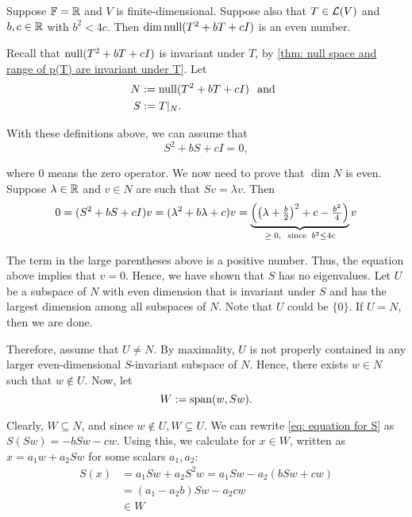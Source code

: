 \begin{thm}
  \label{thm: even-dimensional null space}
  Suppose $\mathbb{F} = \mathbb{R}$ and $V$ is finite-dimensional. Suppose also that $T \in \mathcal{L} (V)$ and $b,c \in \mathbb{R}$ with $b^2 < 4c$. Then $\dim \operatorname{null} (T^2 +bT +cI)$ is an even number.
\end{thm}
\begin{prf}
  Recall that $\operatorname{null} (T^2 +bT +cI)$ is invariant under $T$, by \ref{thm: null space and range of p(T) are invariant under T}. Let
  \begin{align}
    N &:= \operatorname{null} (T^2 +bT +cI) \;\;\, \text{and}\;\; \\
    S &:= T|_N.
  \end{align}

  With these definitions above, we can assume that
  \begin{equation}
    \label{eq: equation for S}
    S^2 + bS + cI = 0,
  \end{equation}

  where $0$ means the zero operator. We now need to prove that $\dim N$ is even. Suppose $\lambda \in \mathbb{R}$ and $v \in N$ are such that $Sv = \lambda v$. Then
  \begin{equation}
    0 = (S^2 + bS + cI)v = (\lambda ^2 + b \lambda + c)v = \underbrace{\left( \left( \lambda + \tfrac{b}{2}\right)^2 + c - \tfrac{b^2}{4} \right)}_{\geq \; 0, \;\;\, \text{since}\;\; b^2 \leq 4c} v
  \end{equation}

  The term in the large parentheses above is a positive number. Thus, the equation above implies that $v = 0$. Hence, we have shown that $S$ has no eigenvalues.
  Let $U$ be a subspace of $N$ with even dimension that is invariant under $S$ and has the largest dimension among all subspaces of $N$. Note that $U$ could be $\{0\}$. If $U = N$, then we are done.

  Therefore, assume that $U \neq N$. By maximality, $U$ is not properly contained in any larger even-dimensional $S$-invariant subspace of $N$. Hence, there exists $w \in N$ such that $w \notin U$. Now, let
  \begin{equation}
    W := \operatorname{span} (w, Sw).
  \end{equation}

  Clearly, $W \subseteq N$, and since $w \notin U, W \subsetneq U$. We can rewrite \eqref{eq: equation for S} as $ S(Sw) = -bSw - cw $. Using this, we calculate for $x \in W$, written as $x = a_1 w + a_2 Sw$ for some scalars $a_1, a_2$:
  \begin{align}
    S(x) &= a_1 S w + a_2 S^2 w = a_1 S w - a_2 (b Sw + cw) \\
         &= (a_1 - a_2 b) Sw -  a_2 c  w \\
         & \in W
  \end{align}


\end{prf}
